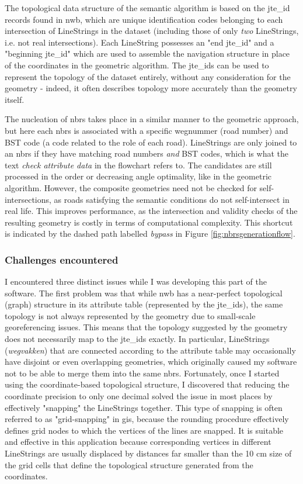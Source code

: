 The topological data structure of the semantic algorithm is based on the \ac{jte_id} records found in \ac{nwb}, which are unique identification codes belonging to each intersection of LineStrings in the dataset (including those of only \textit{two} LineStrings, i.e. not real intersections). Each LineString possesses an "end \ac{jte_id}" and a "beginning \ac{jte_id}" which are used to assemble the navigation structure in place of the coordinates in the geometric algorithm. The \ac{jte_id}s can be used to represent the topology of the dataset entirely, without any consideration for the geometry - indeed, it often describes topology more accurately than the geometry itself.

The nucleation of \ac{nbrs} takes place in a similar manner to the geometric approach, but here each \ac{nbrs} is associated with a specific wegnummer (road number) and BST code (a code related to the role of each road). LineStrings are only joined to an \ac{nbrs} if they have matching road numbers \textit{and} BST codes, which is what the text \textit{check attribute data} in the flowchart refers to. The candidates are still processed in the order or decreasing angle optimality, like in the geometric algorithm. However, the composite geometries need not be checked for self-intersections, as roads satisfying the semantic conditions do not self-intersect in real life. This improves performance, as the intersection and validity checks of the resulting geometry is costly in terms of computational complexity. This shortcut is indicated by the dashed path labelled \textit{bypass} in Figure \ref{fig:nbrsgenerationflow}.

\subsubsection{Challenges encountered}

I encountered three distinct issues while I was developing this part of the software. The first problem was that while \ac{nwb} has a near-perfect topological (graph) structure in its attribute table (represented by the \ac{jte_id}s), the same topology is not always represented by the geometry due to small-scale georeferencing issues. This means that the topology suggested by the geometry does not necessarily map to the \ac{jte_id}s exactly. In particular, LineStrings (\textit{wegvakken}) that are connected according to the attribute table may occasionally have disjoint or even overlapping geometries, which originally caused my software not to be able to merge them into the same \ac{nbrs}. Fortunately, once I started using the coordinate-based topological structure, I discovered that reducing the coordinate precision to only one decimal solved the issue in most places by effectively "snapping" the LineStrings together. This type of snapping is often referred to as "grid-snapping" in \ac{gis}, because the rounding procedure effectively defines grid nodes to which the vertices of the lines are snapped. It is suitable and effective in this application because corresponding vertices in different LineStrings are usually displaced by distances far smaller than the 10 cm size of the grid cells that define the topological structure generated from the coordinates.

